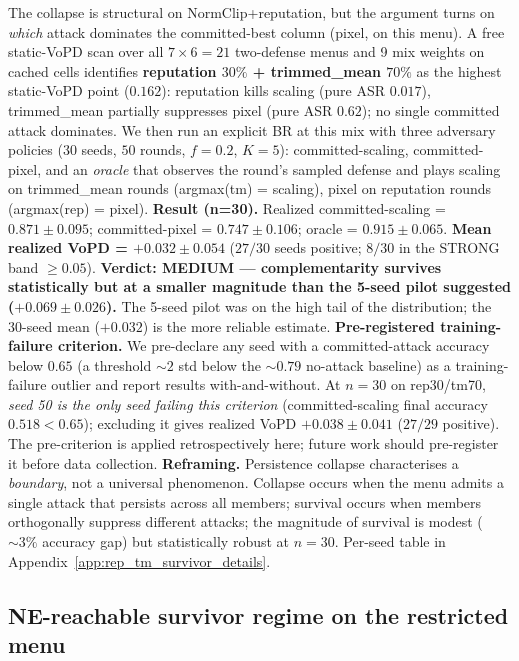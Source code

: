 \documentclass{article}
\begin{document}
The collapse is structural on NormClip+reputation, but the argument turns on \emph{which} attack dominates the committed-best column (pixel, on this menu). A free static-VoPD scan over all $7\times 6 = 21$ two-defense menus and 9 mix weights on cached cells identifies \textbf{reputation $30\%$ + trimmed\_mean $70\%$} as the highest static-VoPD point ($0.162$): reputation kills scaling (pure ASR $0.017$), trimmed\_mean partially suppresses pixel (pure ASR $0.62$); no single committed attack dominates. We then run an explicit BR at this mix with three adversary policies ($30$ seeds, $50$ rounds, $f{=}0.2$, $K{=}5$): committed-scaling, committed-pixel, and an \emph{oracle} that observes the round's sampled defense and plays scaling on trimmed\_mean rounds (argmax(tm) = scaling), pixel on reputation rounds (argmax(rep) = pixel). \textbf{Result (n=30).} Realized committed-scaling = $\mathbf{0.871 \pm 0.095}$; committed-pixel = $0.747 \pm 0.106$; oracle = $\mathbf{0.915 \pm 0.065}$. \textbf{Mean realized VoPD = $\mathbf{+0.032 \pm 0.054}$} ($27/30$ seeds positive; $8/30$ in the STRONG band $\geq 0.05$). \textbf{Verdict: MEDIUM --- complementarity survives statistically but at a smaller magnitude than the 5-seed pilot suggested ($+0.069 \pm 0.026$).} The 5-seed pilot was on the high tail of the distribution; the 30-seed mean ($+0.032$) is the more reliable estimate. \textbf{Pre-registered training-failure criterion.} We pre-declare any seed with a committed-attack accuracy below $0.65$ (a threshold $\sim 2$ std below the $\sim 0.79$ no-attack baseline) as a training-failure outlier and report results with-and-without. At $n=30$ on rep30/tm70, \emph{seed 50 is the only seed failing this criterion} (committed-scaling final accuracy $0.518 < 0.65$); excluding it gives realized VoPD $+0.038 \pm 0.041$ ($27/29$ positive). The pre-criterion is applied retrospectively here; future work should pre-register it before data collection. \textbf{Reframing.} Persistence collapse characterises a \emph{boundary}, not a universal phenomenon. Collapse occurs when the menu admits a single attack that persists across all members; survival occurs when members orthogonally suppress different attacks; the magnitude of survival is modest ($\sim 3\%$ accuracy gap) but statistically robust at $n=30$. Per-seed table in Appendix~\ref{app:rep_tm_survivor_details}.

\subsection{NE-reachable survivor regime on the restricted menu}
\label{sec:ne_restricted_menu}
\end{document}
